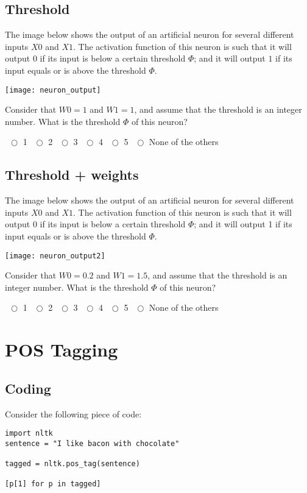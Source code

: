 \documentclass[a4paper,11pt]{scrartcl}
\begin{document}
\subsection{Threshold}

The image below shows the output of an artificial neuron for several different
inputs $X0$ and $X1$. The activation function of this neuron is such that it
will output $0$ if its input is below a certain threshold $\Phi$; and it will
output $1$ if its input equals or is above the threshold $\Phi$.

\texttt{[image: neuron\_output]}

Consider that $W0 = 1$ and $W1 = 1$, and assume that the threshold is an integer
number. What is the threshold $\Phi$ of this neuron?

$~~\bigcirc$ 1
$~~\bigcirc$ 2
$~~\bigcirc$ 3
$~~\bigcirc$ 4
$~~\bigcirc$ 5
$~~\bigcirc$ None of the others



\subsection{Threshold + weights}

The image below shows the output of an artificial neuron for several different
inputs $X0$ and $X1$. The activation function of this neuron is such that it
will output 0 if its input is below a certain threshold $\Phi$; and it will
output 1 if its input equals or is above the threshold $\Phi$.

\texttt{[image: neuron\_output2]}

Consider that $W0 = 0.2$ and $W1 = 1.5$, and assume that the threshold is an
integer number. What is the threshold $\Phi$ of this neuron?

$~~\bigcirc$ 1
$~~\bigcirc$ 2
$~~\bigcirc$ 3
$~~\bigcirc$ 4
$~~\bigcirc$ 5
$~~\bigcirc$ None of the others


\section{POS Tagging}

\subsection{Coding}

Consider the following piece of code:

{\singlespacing
\begin{verbatim}
import nltk
sentence = "I like bacon with chocolate"

tagged = nltk.pos_tag(sentence)

[p[1] for p in tagged]
\end{verbatim}
}
\end{document}
